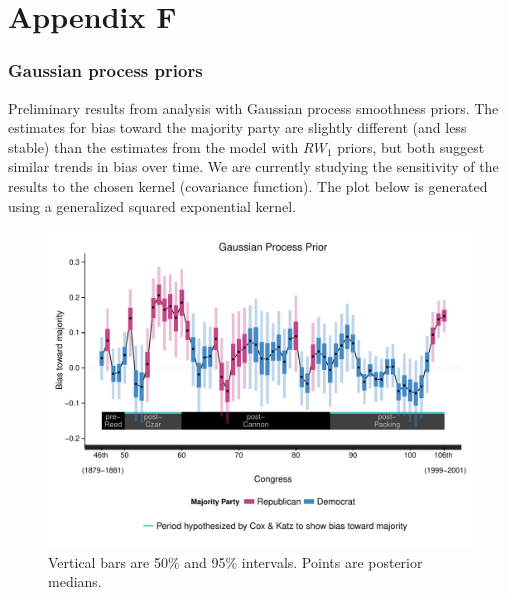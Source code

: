 \chapter*{Appendix F}\label{AppendixF}
\vspace{-1.75cm}
\subsection{Gaussian process priors}

Preliminary results from analysis with Gaussian process smoothness priors. The estimates
for bias toward the majority party are slightly different (and less stable) than the estimates 
from the model with $RW_1$ priors, but both suggest similar trends in bias over time.  
We are currently studying the sensitivity of the results to the chosen kernel (covariance function).  
The plot below is generated using a generalized squared exponential kernel.  

\begin{figure}[h]
\centering
	\includegraphics[scale=0.7]{sections/figs/ck_replication_gp}
\caption*{Vertical bars are 50\% and 95\% intervals. Points are posterior medians.}
\label{fig:gp_prior}
\end{figure}


